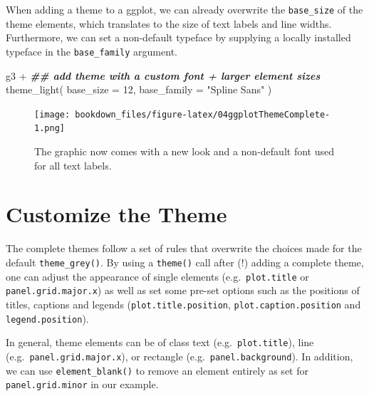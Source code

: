 \documentclass[
]{krantz}
\makeatletter
\newenvironment{Shaded}{\begin{snugshade}}{\end{snugshade}}
\newcommand{\AttributeTok}[1]{\textcolor[rgb]{0.61,0.61,0.61}{#1}}
\newcommand{\DecValTok}[1]{\textcolor[rgb]{0.06,0.06,0.06}{#1}}
\newcommand{\DocumentationTok}[1]{\textcolor[rgb]{0.37,0.37,0.37}{\textbf{\textit{#1}}}}
\newcommand{\FunctionTok}[1]{\textcolor[rgb]{0,0,0}{#1}}
\newcommand{\NormalTok}[1]{#1}
\newcommand{\SpecialCharTok}[1]{\textcolor[rgb]{0,0,0}{#1}}
\newcommand{\StringTok}[1]{\textcolor[rgb]{0.5,0.5,0.5}{#1}}
\newenvironment{kframe}{%
\medskip{}
\setlength{\fboxsep}{.8em}
 \def\at@end@of@kframe{}%
 \ifinner\ifhmode%
  \def\at@end@of@kframe{\end{minipage}}%
  \begin{minipage}{\columnwidth}%
 \fi\fi%
 \def\FrameCommand##1{\hskip\@totalleftmargin \hskip-\fboxsep
 \colorbox{shadecolor}{##1}\hskip-\fboxsep
     \hskip-\linewidth \hskip-\@totalleftmargin \hskip\columnwidth}%
 \MakeFramed {\advance\hsize-\width
   \@totalleftmargin\z@ \linewidth\hsize
   \@setminipage}}%
 {\par\unskip\endMakeFramed%
 \at@end@of@kframe}
\renewenvironment{Shaded}{\begin{kframe}}{\end{kframe}}
\makeatother
\begin{document}
When adding a theme to a ggplot, we can already overwrite the \texttt{base\_size} of the theme elements, which translates to the size of text labels and line widths. Furthermore, we can set a non-default typeface by supplying a locally installed typeface in the \texttt{base\_family} argument.

\begin{Shaded}
\begin{Highlighting}[]
\NormalTok{g3 }\SpecialCharTok{+}
  \DocumentationTok{\#\# add theme with a custom font + larger element sizes}
  \FunctionTok{theme\_light}\NormalTok{(}
    \AttributeTok{base\_size =} \DecValTok{12}\NormalTok{, }\AttributeTok{base\_family =} \StringTok{"Spline Sans"}
\NormalTok{  )}
\end{Highlighting}
\end{Shaded}

\begin{figure}
\centering
\texttt{[image: bookdown\_files/figure-latex/04ggplotThemeComplete-1.png]}
\caption{\label{fig:04ggplotThemeComplete}The graphic now comes with a new look and a non-default font used for all text labels.}
\end{figure}

\hypertarget{custom-theming}{%
\section{Customize the Theme}\label{custom-theming}}

The complete themes follow a set of rules that overwrite the choices made for the default \texttt{theme\_grey()}. By using a \texttt{theme()} call after (!) adding a complete theme, one can adjust the appearance of single elements (e.g.~\texttt{plot.title} or \texttt{panel.grid.major.x}) as well as set some pre-set options such as the positions of titles, captions and legends (\texttt{plot.title.position}, \texttt{plot.caption.position} and \texttt{legend.position}).

In general, theme elements can be of class text (e.g.~\texttt{plot.title}), line (e.g.~\texttt{panel.grid.major.x}), or rectangle (e.g.~\texttt{panel.background}). In addition, we can use \texttt{element\_blank()} to remove an element entirely as set for \texttt{panel.grid.minor} in our example.
\end{document}
